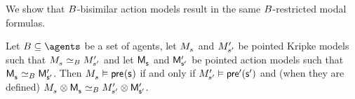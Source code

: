 We show that $B$-bisimilar action models result in the same $B$-restricted modal formulas.

\begin{lemma}\label{action-b-bisimulation-results}
Let $\agentsB \subseteq \agents$ be a set of agents, let $\kPModel{\kStateS}$ and ${M^{\prime}_{{s}^{\prime}}}$ be pointed Kripke models such that $\kPModel{\kStateS} \bisimilar[\agentsB] \kPModelP{\kStateSP}$ and let $\aPModel{\aStateS}$ and ${\mathsf{M}^{\prime}_{{\mathsf{{s}}^{\prime}}}}$ be pointed action models such that $\aPModel{\aStateS} \bisimilar[\agentsB] \aPModelP{\aStateSP}$.
Then $\kPModel{\kStateS} \entails \aPrecondition(\aStateS)$ if and only if ${M^{\prime}_{{s}^{\prime}}} \vDash {\mathsf{pre}^{\prime}}({\mathsf{{s}}^{\prime}})$ and (when they are defined) $\kPModel{\kStateS} \exec \aPModel{\aStateS} \bisimilar[\agentsB] \kPModelP{\kStateSP} \exec \aPModelP{\aStateSP}$.
\end{lemma}

